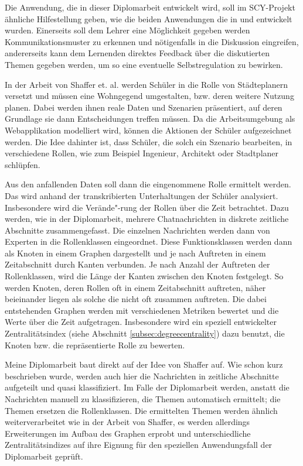 Die Anwendung, die in dieser Diplomarbeit entwickelt wird, soll im SCY-Projekt ähnliche Hilfestellung geben, wie die beiden Anwendungen die in \citet{Anjewerden2007} und \citet{Miksatko2008Whats} entwickelt wurden. Einerseits soll dem Lehrer eine Möglichkeit gegeben werden Kommunikationsmuster zu erkennen und nötigenfalls in die Diskussion eingreifen, andererseits kann dem Lernenden direktes Feedback über die diskutierten Themen gegeben werden, um so eine eventuelle Selbstregulation zu bewirken.
 
In der Arbeit von Shaffer et. al. \citep{shafferEpistemicFrames} werden Schüler in die Rolle von Städteplanern versetzt und müssen eine Wohngegend umgestalten, bzw. deren weitere Nutzung planen. Dabei werden ihnen reale Daten und Szenarien präsentiert, auf deren Grundlage sie dann Entscheidungen treffen müssen. Da die Arbeitsumgebung als Webapplikation modelliert wird, können die Aktionen der Schüler aufgezeichnet werden. Die Idee dahinter ist, dass Schüler, die solch ein Szenario bearbeiten, in verschiedene Rollen, wie zum Beispiel Ingenieur, Architekt oder Stadtplaner schlüpfen.

Aus den anfallenden Daten soll dann die eingenommene Rolle ermittelt werden. Das wird anhand der transkribierten Unterhaltungen der Schüler analysiert. Insbesondere wird die Verände"-rung der Rollen über die Zeit betrachtet. Dazu werden, wie in der Diplomarbeit, mehrere Chatnachrichten in diskrete zeitliche Abschnitte zusammengefasst. Die einzelnen Nachrichten werden dann von Experten in die Rollenklassen eingeordnet. Diese Funktionsklassen werden dann als Knoten in einem Graphen dargestellt und je nach Auftreten in einem Zeitabschnitt durch Kanten verbunden. Je nach Anzahl der Auftreten der Rollenklassen, wird die Länge der Kanten zwischen den Knoten festgelegt. So werden Knoten, deren Rollen oft in einem Zeitabschnitt auftreten, näher beieinander liegen als solche die nicht oft zusammen auftreten. Die dabei entstehenden Graphen werden mit verschiedenen Metriken bewertet und die Werte über die Zeit aufgetragen. Insbesondere wird ein speziell entwickelter Zentralitätsindex (siehe Abschnitt \ref{subsec:degreecentrality}) dazu benutzt, die Knoten bzw. die repräsentierte Rolle zu bewerten. 

Meine Diplomarbeit baut direkt auf der Idee von Shaffer auf. Wie schon kurz beschrieben wurde, werden auch hier die Nachrichten in zeitliche Abschnitte aufgeteilt und quasi klassifiziert. Im Falle der Diplomarbeit werden, anstatt die Nachrichten manuell zu klassifizieren, die Themen automatisch ermittelt; die Themen ersetzen die Rollenklassen. Die ermittelten Themen werden ähnlich weiterverarbeitet wie in der Arbeit von Shaffer, es werden allerdings Erweiterungen im Aufbau des Graphen erprobt und unterschiedliche Zentralitätsindizes auf ihre Eignung für den speziellen Anwendungsfall der Diplomarbeit geprüft. 

